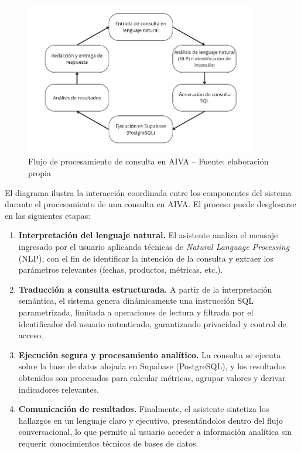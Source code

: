 \begin{figure}[!htbp]
 \centering

 \includegraphics[width=0.9\textwidth]{images/ConsultaSQL.png}

 \caption{Flujo de procesamiento de consulta en AIVA -- Fuente: elaboración propia}

 \label{fig:flujo-consulta}

\end{figure}



El diagrama ilustra la interacción coordinada entre los componentes del sistema durante el procesamiento de una consulta en AIVA. El proceso puede desglosarse en las siguientes etapas:



\begin{enumerate}[label=\arabic*., leftmargin=*, nosep]

 \item \textbf{Interpretación del lenguaje natural.} El asistente analiza el mensaje ingresado por el usuario aplicando técnicas de \textit{Natural Language Processing} (NLP), con el fin de identificar la intención de la consulta y extraer los parámetros relevantes (fechas, productos, métricas, etc.).

\item \textbf{Traducción a consulta estructurada.} A partir de la interpretación semántica, el sistema genera dinámicamente una instrucción SQL parametrizada, limitada a operaciones de lectura y filtrada por el identificador del usuario autenticado, garantizando privacidad y control de acceso.

\item \textbf{Ejecución segura y procesamiento analítico.} La consulta se ejecuta sobre la base de datos alojada en Supabase (PostgreSQL), y los resultados obtenidos son procesados para calcular métricas, agrupar valores y derivar indicadores relevantes.

\item \textbf{Comunicación de resultados.} Finalmente, el asistente sintetiza los hallazgos en un lenguaje claro y ejecutivo, presentándolos dentro del flujo conversacional, lo que permite al usuario acceder a información analítica sin requerir conocimientos técnicos de bases de datos.

\end{enumerate}

